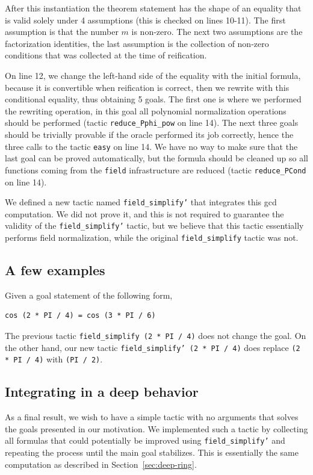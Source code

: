 \documentclass{jflart}
\begin{document}
After this instantiation the theorem statement
has the shape of an equality that is
valid solely under 4 assumptions (this is checked on lines 10-11).  The first
assumption is that the
number \(m\) is non-zero.  The next two assumptions are the factorization
identities, the last assumption is the collection of non-zero conditions
that was collected at the time of reification.

On line 12, we change the left-hand side
of the equality with the initial formula, because it is convertible
when reification is correct, then we rewrite with this conditional
equality, thus obtaining 5 goals.  The first one is where we performed
the rewriting operation, in this goal all polynomial normalization operations
should be performed (tactic \texttt{reduce\_Pphi\_pow} on line 14).  The next
three goals
should be trivially provable if the oracle performed its job correctly, hence
the three calls to the tactic \texttt{easy} on line 14.  We have no way to make
sure that the last goal can be proved automatically, but the formula
should be cleaned up so all functions coming from the \texttt{field}
infrastructure are reduced (tactic \texttt{reduce\_PCond} on line 14).

We defined a new tactic named \texttt{field\_simplify'} that integrates this
gcd computation.  We did not prove it, and this is not required to guarantee
the validity of the \texttt{field\_simplify'} tactic, but we believe that
this tactic essentially performs field normalization, while the original
\texttt{field\_simplify} tactic was not.

\subsection{A few examples}

Given a goal statement of the following form, 
\begin{lstlisting}
cos (2 * PI / 4) = cos (3 * PI / 6)
\end{lstlisting}
The previous tactic \texttt{field\_simplify (2 * PI / 4)} does not change
the goal.  On the other hand, our new tactic
\texttt{field\_simplify' (2 * PI / 4)} does replace \texttt{(2 * PI / 4)}
with \texttt{(PI / 2)}.

\subsection{Integrating in a deep behavior}
As a final result, we wish to have a simple tactic with no arguments that
solves the goals presented in our motivation.  We implemented such a tactic
by collecting all formulas that could potentially be improved using
\texttt{field\_simplify'} and repeating the process until the main goal
stabilizes. This is essentially the same computation as described in
Section~\ref{sec:deep-ring}.
\end{document}
